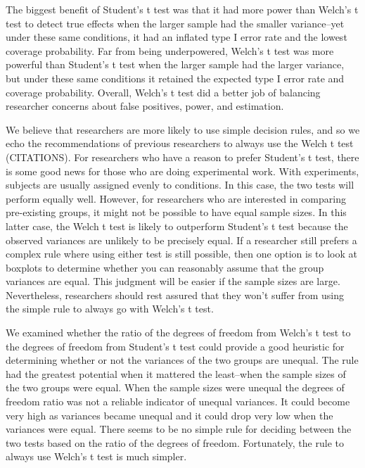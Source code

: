 \documentclass[man,a4paper,noextraspace,apacite]{apa6}
\begin{document}
    The biggest benefit of Student's t test was that it had more power than Welch's t test to detect true effects when the larger sample had the smaller variance--yet under these same conditions, it had an inflated type I error rate and the lowest coverage probability. Far from being underpowered, Welch's t test was more powerful than Student's t test when the larger sample had the larger variance, but under these same conditions it retained the expected type I error rate and coverage probability. Overall, Welch's t test did a better job of balancing researcher concerns about false positives, power, and estimation.
    
    We believe that researchers are more likely to use simple decision rules, and so we echo the recommendations of previous researchers to always use the Welch t test (CITATIONS). For researchers who have a reason to prefer Student's t test, there is some good news for those who are doing experimental work. With experiments, subjects are usually assigned evenly to conditions. In this case, the two tests will perform equally well. However, for researchers who are interested in comparing pre-existing groups, it might not be possible to have equal sample sizes. In this latter case, the Welch t test is likely to outperform Student's t test because the observed variances are unlikely to be precisely equal. If a researcher still prefers a complex rule where using either test is still possible, then one option is to look at boxplots to determine whether you can reasonably assume that the group variances are equal. This judgment will be easier if the sample sizes are large. Nevertheless, researchers should rest assured that they won't suffer from using the simple rule to always go with Welch's t test.
    
    We examined whether the ratio of the degrees of freedom from Welch's t test to the degrees of freedom from Student's t test could provide a good heuristic for determining whether or not the variances of the two groups are unequal. The rule had the greatest potential when it mattered the least--when the sample sizes of the two groups were equal. When the sample sizes were unequal the degrees of freedom ratio was not a reliable indicator of unequal variances. It could become very high as variances became unequal and it could drop very low when the variances were equal. There seems to be no simple rule for deciding between the two tests based on the ratio of the degrees of freedom. Fortunately, the rule to always use Welch's t test is much simpler.
    
\end{document}
